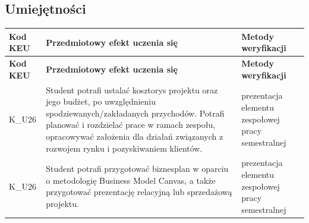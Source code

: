 \documentclass[12pt, a4paper]{article}
\newcommand{\thdrule}{\noalign{\global\setlength{\extrarowheight}{0pt}}}
\newcommand{\thdend}{\noalign{\global\setlength{\extrarowheight}{3pt}}}
\begin{document}
\subsection*{Umiejętności}
{\scriptsize
\begin{longtable}{m{1.6cm}m{9.0cm}m{4.2cm}}
\thdrule\toprule
\rowcolor{pjatkRed} {\color{white}\footnotesize\textbf{\vphantom{Ag}Kod KEU}} & {\color{white}\footnotesize\textbf{\vphantom{Ag}Przedmiotowy efekt uczenia się}} & {\color{white}\footnotesize\textbf{\vphantom{Ag}Metody weryfikacji}} \\
\midrule\thdend
\endfirsthead
\thdrule\toprule
\rowcolor{pjatkRed} {\color{white}\footnotesize\textbf{\vphantom{Ag}Kod KEU}} & {\color{white}\footnotesize\textbf{\vphantom{Ag}Przedmiotowy efekt uczenia się}} & {\color{white}\footnotesize\textbf{\vphantom{Ag}Metody weryfikacji}} \\
\midrule\thdend
\endhead
  \rowcolor{tableRowLight} K\_U26 & Student potrafi  ustalać kosztorys projektu oraz jego budżet, po uwzględnieniu spodziewanych/zakładanych przychodów.  Potrafi planować i rozdzielać prace w ramach zespołu, opracowywać założenia dla działań związanych z rozwojem rynku i pozyskiwaniem klientów. & prezentacja elementu zespołowej pracy semestralnej \\
  \rowcolor{tableRowAlt} K\_U26 & Student potrafi  przygotować biznesplan w oparciu o metodologię  Business Model Canvas, a także przygotować prezentację relacyjną lub sprzedażową projektu. & prezentacja elementu zespołowej pracy semestralnej \\
\bottomrule
\end{longtable}}
\end{document}
